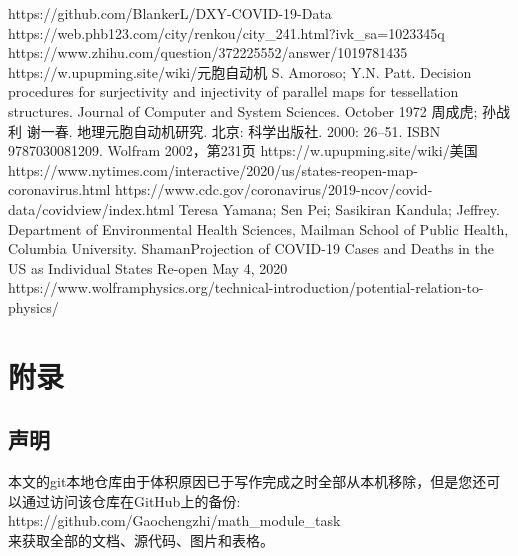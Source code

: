 \documentclass[UTF8]{ctexart}
\begin{document}
\newpage


\begin{thebibliography}{66}
    https://github.com/BlankerL/DXY-COVID-19-Data
    https://web.phb123.com/city/renkou/city\_241.html?ivk\_sa=1023345q 
    https://www.zhihu.com/question/372225552/answer/1019781435
    https://w.upupming.site/wiki/元胞自动机
    S. Amoroso; Y.N. Patt. Decision procedures for surjectivity and injectivity of parallel maps for tessellation structures. Journal of Computer and System Sciences. October 1972
    周成虎; 孙战利 谢一春. 地理元胞自动机研究. 北京: 科学出版社. 2000: 26–51. ISBN 9787030081209.
    Wolfram 2002，第231页
    https://w.upupming.site/wiki/美国
    https://www.nytimes.com/interactive/2020/us/states-reopen-map-coronavirus.html
    https://www.cdc.gov/coronavirus/2019-ncov/covid-data/covidview/index.html
    Teresa Yamana; Sen Pei; Sasikiran Kandula; Jeffrey. Department of Environmental Health Sciences, Mailman School of Public Health,
    Columbia University. ShamanProjection of COVID-19 Cases and Deaths in the US as Individual States Re-open May 4, 2020
    https://www.wolframphysics.org/technical-introduction/potential-relation-to-physics/
    \end{thebibliography}

\newpage
\section{附录}
\subsection{声明}
\par 
本文的git本地仓库由于体积原因已于写作完成之时全部从本机移除，但是您还可以通过访问该仓库在GitHub上的备份:
\\ 
https://github.com/Gaochengzhi/math\_module\_task 
\\ 来获取全部的文档、源代码、图片和表格。
\end{document}
